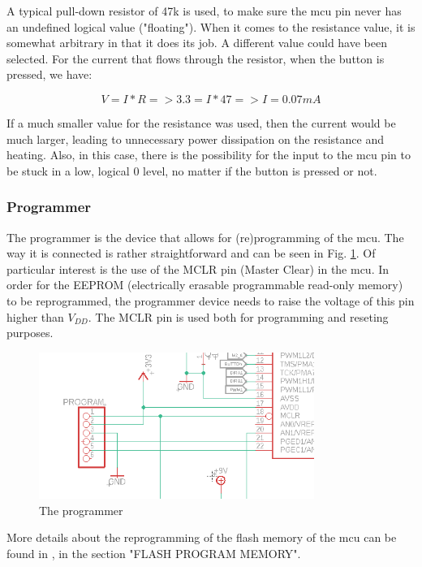 \FloatBarrier

A typical pull-down resistor of 47k is used, to make sure the mcu pin never has an undefined logical value ("floating"). When it comes to the resistance value, it is somewhat arbitrary in that it does its job. A different value could have been selected.
For the current that flows through the resistor, when the button is pressed, we have:

$$V = I*R => 3.3 = I*47 => I = 0.07mA$$

If a much smaller value for the resistance was used, then the current would be much larger, leading to unnecessary power dissipation on the resistance and heating. Also, in this case, there is the possibility for the input to the mcu pin to be stuck in a low, logical 0 level, no matter if the button is pressed or not.

\vspace{1cm}


\subsubsection{Programmer}

The programmer is the device that allows for (re)programming of the mcu. The way it is connected is rather straightforward and can be seen in Fig. \ref{fig:programmer}.
Of particular interest is the use of the MCLR pin (Master Clear) in the mcu. In order for the EEPROM (electrically erasable programmable read-only memory) to be reprogrammed, the programmer device needs to raise the voltage of this pin higher than $V_{DD}$. The MCLR pin is used both for programming and reseting purposes.

\begin{figure}[htb]
    \centering
    \includegraphics[width=0.8\textwidth]{figures/hardware/Programmer.PNG}
    \caption{The programmer}
    \label{fig:programmer}
\end{figure}

More details about the reprogramming of the flash memory of the mcu can be found in \cite{mcu}, in the section "FLASH PROGRAM MEMORY".

